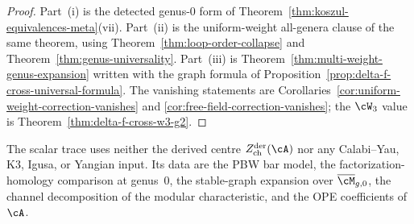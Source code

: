 \begin{proof}
Part~\textup{(i)} is the detected genus-$0$ form of
Theorem~\textup{\ref{thm:koszul-equivalences-meta}}\textup{(vii)}.
Part~\textup{(ii)} is the uniform-weight all-genera clause of the
same theorem, using
Theorem~\textup{\ref{thm:loop-order-collapse}} and
Theorem~\textup{\ref{thm:genus-universality}}. Part~\textup{(iii)} is
Theorem~\textup{\ref{thm:multi-weight-genus-expansion}} written with
the graph formula of
Proposition~\textup{\ref{prop:delta-f-cross-universal-formula}}. The
vanishing statements are
Corollaries~\textup{\ref{cor:uniform-weight-correction-vanishes}} and
\textup{\ref{cor:free-field-correction-vanishes}}; the $\cW_3$ value
is Theorem~\textup{\ref{thm:delta-f-cross-w3-g2}}.
\end{proof}

\begin{remark}
\label{rem:kos-vii-platonic-is-II}
The scalar trace uses neither the derived centre
$Z^{\mathrm{der}}_{\mathrm{ch}}(\cA)$ nor any Calabi--Yau, K3,
Igusa, or Yangian input. Its data are the PBW bar model, the
factorization-homology comparison at genus~$0$, the stable-graph
expansion over $\overline{\cM}_{g,0}$, the channel decomposition of
the modular characteristic, and the OPE coefficients of~$\cA$.
\end{remark}
